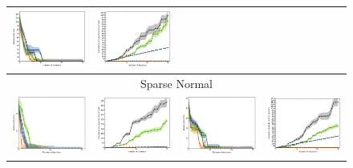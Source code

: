 \documentclass{article}
\renewcommand\[{\begin{equation}}
\renewcommand\]{\end{equation}}
\begin{document}
\begin{figure}[b]
{\begin{tabular}{cccc}
        \includegraphics[width=10em]{figures/synthetic_vs_others_4_uniform_sparse_per_iter_loss} &
        \includegraphics[width=10em]{figures/synthetic_vs_others_4_uniform_sparse_per_iter_time}
        \\
        \hline
        \multicolumn{4}{c}{{\sc Sparse Normal}}
        \\
        \includegraphics[width=10em]{figures/synthetic_vs_others_3_normal_sparse_per_iter_loss} &
        \includegraphics[width=10em]{figures/synthetic_vs_others_3_normal_sparse_per_iter_time} &
        \includegraphics[width=10em]{figures/synthetic_vs_others_4_normal_sparse_per_iter_loss} &
        \includegraphics[width=10em]{figures/synthetic_vs_others_4_normal_sparse_per_iter_time}

\end{tabular}}
\end{figure}
\end{document}
